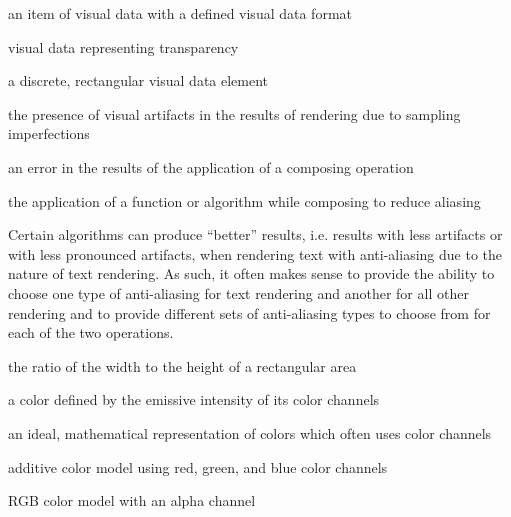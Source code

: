 %
an item of visual data with a defined visual data format

%
visual data representing transparency

a discrete, rectangular visual data element

%
the presence of visual artifacts in the results of rendering due to 
sampling imperfections

%
an error in the results of the application of a composing operation 

%
the application of a function or algorithm while composing to 
reduce aliasing
\begin{note}
Certain algorithms can produce ``better'' results, i.e. results with less 
artifacts or with less pronounced artifacts, when rendering text with 
anti-aliasing due to the nature of text rendering. As such, it often makes 
sense to provide the ability to choose one type of anti-aliasing for text 
rendering and another for all other rendering and to provide different sets of 
anti-aliasing types to choose from for each of the two operations.
\end{note}

%
the ratio of the width to the height of a rectangular area

%
a color defined by the emissive intensity of its color channels

%
an ideal, mathematical representation of colors which often uses color channels

%
%
 additive color model using red, green, and blue color channels

%
%
 RGB color model with an alpha channel

